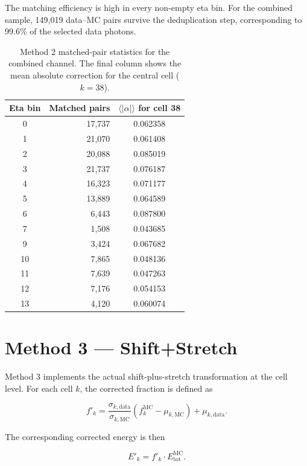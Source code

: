 \documentclass[11pt,a4paper]{article}
\begin{document}
The matching efficiency is high in every non-empty eta bin. For the combined
sample, 149,019 data--MC pairs survive the deduplication step, corresponding to
99.6\% of the selected data photons.

\begin{table}[H]
\centering
\caption{Method 2 matched-pair statistics for the combined channel. The final column shows the mean absolute correction for the central cell ($k=38$).}
\label{tab:m2-matched-combined}
\begin{tabular}{crc}
\toprule
Eta bin & Matched pairs & $\langle |\alpha| \rangle$ for cell 38 \\
\midrule
0 & 17,737 & 0.062358 \\
1 & 21,070 & 0.061408 \\
2 & 20,088 & 0.085019 \\
3 & 21,737 & 0.076187 \\
4 & 16,323 & 0.071177 \\
5 & 13,889 & 0.064589 \\
6 & 6,443 & 0.087800 \\
7 & 1,508 & 0.043685 \\
9 & 3,424 & 0.067682 \\
10 & 7,865 & 0.048136 \\
11 & 7,639 & 0.047263 \\
12 & 7,176 & 0.054153 \\
13 & 4,120 & 0.060074 \\
\bottomrule
\end{tabular}
\end{table}

\section{Method 3 --- Shift+Stretch}

Method 3 implements the actual shift-plus-stretch transformation at the cell
level. For each cell $k$, the corrected fraction is defined as

\begin{equation}
  f'_k = \frac{\sigma_{k,\mathrm{data}}}{\sigma_{k,\mathrm{MC}}}
         \left(f_k^{\mathrm{MC}} - \mu_{k,\mathrm{MC}}\right)
         + \mu_{k,\mathrm{data}}.
\end{equation}

The corresponding corrected energy is then

\begin{equation}
  E'_k = f'_k \cdot E_{\mathrm{tot}}^{\mathrm{MC}}.
\end{equation}
\end{document}
